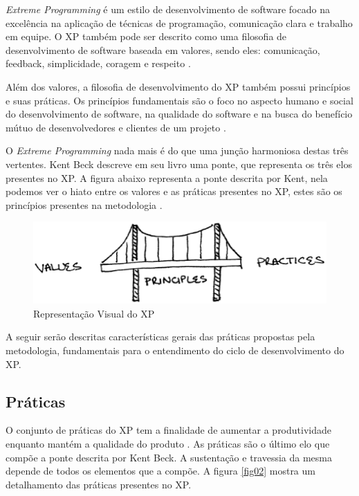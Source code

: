 \textit{Extreme Programming} é um estilo de desenvolvimento de software focado na excelência na aplicação de técnicas de programação, comunicação clara e trabalho em equipe. O XP também pode ser descrito como uma filosofia de desenvolvimento de software baseada em valores, sendo eles: comunicação, feedback, simplicidade, coragem e respeito \cite{Beck:1999}.

Além dos valores, a filosofia de desenvolvimento do XP também possui princípios e suas práticas. Os princípios fundamentais são o foco no aspecto humano e social do desenvolvimento de software, na qualidade do software e na busca do benefício mútuo  de desenvolvedores e clientes de um projeto \cite{Beck:2004}.

O \textit{Extreme Programming} nada mais é do que uma junção harmoniosa destas três vertentes. Kent Beck descreve em seu livro uma ponte, que representa os três elos presentes no XP. A figura abaixo representa a ponte descrita por Kent, nela podemos ver o hiato entre os valores e as práticas presentes no XP,  estes são os princípios presentes na metodologia \cite{Beck:2004}.

\begin{figure}[h]
	\centering
	\includegraphics[keepaspectratio=true,scale=0.7]{figuras/fig01.eps}
	\caption{Representação Visual do XP \cite{Beck:2004}}
	\label{fig01}
\end{figure}

A seguir serão descritas características gerais das práticas propostas pela metodologia, fundamentais para o entendimento do ciclo de desenvolvimento do XP.

\subsection{Práticas}

O conjunto de práticas do XP tem a finalidade de aumentar a produtividade enquanto mantém a qualidade do produto \cite{Maurer:2002}. As práticas são o último elo que compõe a ponte descrita por Kent Beck. A sustentação e travessia da mesma depende de todos os elementos que a compõe. A figura \ref{fig02} mostra um detalhamento das práticas presentes no XP.

